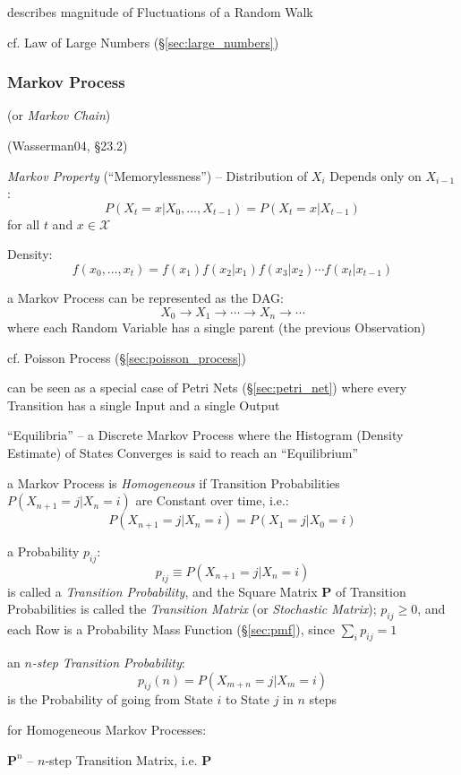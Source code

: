 describes magnitude of Fluctuations of a Random Walk

cf. Law of Large Numbers (\S\ref{sec:large_numbers})



\subsubsection{Markov Process}\label{sec:markov_process}

(or \emph{Markov Chain})

(Wasserman04, \S23.2)

\emph{Markov Property} (``Memorylessness'') --
Distribution of $X_i$ Depends only on $X_{i-1}$:
\[
  P(X_t = x | X_0, \ldots, X_{t-1}) = P(X_t = x | X_{t-1})
\]
for all $t$ and $x \in \mathcal{X}$

Density:
\[
  f(x_0, \ldots, x_t) = f(x_1)f(x_2|x_1)f(x_3|x_2) \cdots f(x_t|x_{t-1})
\]

a Markov Process can be represented as the DAG:
\[
  X_0 \longrightarrow X_1 \longrightarrow \cdots \longrightarrow X_n
    \longrightarrow \cdots
\]
where each Random Variable has a single parent (the previous Observation)

cf. Poisson Process (\S\ref{sec:poisson_process})

\fist can be seen as a special case of Petri Nets (\S\ref{sec:petri_net}) where
every Transition has a single Input and a single Output

``Equilibria'' -- a Discrete Markov Process where the Histogram (Density
Estimate) of States Converges is said to reach an ``Equilibrium''

a Markov Process is \emph{Homogeneous} if Transition Probabilities
$P(X_{n+1} = j | X_n = i)$ are Constant over time, i.e.:
\[
  P(X_{n+1} = j | X_n = i) = P(X_1 = j| X_0 = i)
\]

a Probability $p_{ij}$:
\[
  p_{ij} \equiv P(X_{n+1} = j | X_n = i)
\]
is called a \emph{Transition Probability}, and the Square Matrix $\mathbf{P}$ of
Transition Probabilities is called the \emph{Transition Matrix} (or
\emph{Stochastic Matrix});
$p_{ij} \geq 0$, and each Row is a Probability Mass Function (\S\ref{sec:pmf}),
since $\sum_i p_{ij} = 1$

an \emph{$n$-step Transition Probability}:
\[
  p_{ij}(n) = P(X_{m+n} = j | X_m = i)
\]
is the Probability of going from State $i$ to State $j$ in $n$ steps

for Homogeneous Markov Processes:

$\mathbf{P}^n$ -- $n$-step Transition Matrix, i.e. $\mathbf{P}$

